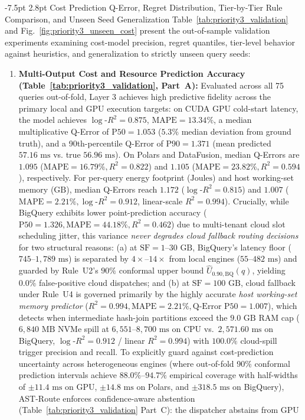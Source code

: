 \documentclass[10pt,a4paper]{article}
\makeatletter
\renewcommand\subsection{\@startsection{subsection}{2}{\z@}%
  {-7.5pt \@plus -2pt \@minus -1pt}%
  {2.8pt \@plus 1pt}%
  {\normalfont\normalsize\bfseries}}
\makeatother
\begin{document}
\subsection{Cost Prediction Q-Error, Regret Distribution, Tier-by-Tier Rule Comparison, and Unseen Seed Generalization}
Table~\ref{tab:priority3_validation} and Fig.~\ref{fig:priority3_unseen_cost} present the out-of-sample validation experiments examining cost-model precision, regret quantiles, tier-level behavior against heuristics, and generalization to strictly unseen query seeds:
\begin{enumerate}[leftmargin=1.5em,itemsep=0.8pt]
    \item \textbf{Multi-Output Cost and Resource Prediction Accuracy (Table~\ref{tab:priority3_validation}, Part~A):} Evaluated across all 75 queries out-of-fold, Layer 3 achieves high predictive fidelity across the primary local and GPU execution targets: on CUDA GPU cold-start latency, the model achieves $\log\text{-}R^2 = \mathbf{0.875}$, $\text{MAPE} = \mathbf{13.34\%}$, a median multiplicative Q-Error of $\text{P50} = \mathbf{1.053}$ ($5.3\%$ median deviation from ground truth), and a 90th-percentile Q-Error of $\text{P90} = \mathbf{1.371}$ (mean predicted $57.16\text{ ms}$ vs. true $56.96\text{ ms}$). On Polars and DataFusion, median Q-Errors are $\mathbf{1.095}$ ($\text{MAPE}=16.79\%, R^2=0.822$) and $\mathbf{1.105}$ ($\text{MAPE}=23.82\%, R^2=0.594$), respectively. For per-query energy footprint ($\text{Joules}$) and host working-set memory ($\text{GB}$), median Q-Errors reach $\mathbf{1.172}$ ($\log\text{-}R^2=0.815$) and $\mathbf{1.007}$ ($\text{MAPE}=2.21\%, \log\text{-}R^2=0.912$, linear-scale $R^2=0.994$). Crucially, while BigQuery exhibits lower point-prediction accuracy ($\text{P50}=1.326, \text{MAPE}=44.18\%, R^2=0.462$) due to multi-tenant cloud slot scheduling jitter, this variance \emph{never degrades cloud fallback routing decisions} for two structural reasons: (a) at $\text{SF}=1\text{--}30\text{ GB}$, BigQuery's latency floor ($745\text{--}1{,}789\text{ ms}$) is separated by $4\times\text{--}14\times$ from local engines ($55\text{--}482\text{ ms}$) and guarded by Rule~U2's $90\%$ conformal upper bound $\hat{U}_{0.90,\text{BQ}}(q)$, yielding $\mathbf{0.0\%}$ false-positive cloud dispatches; and (b) at $\text{SF}=100\text{ GB}$, cloud fallback under Rule~U4 is governed primarily by the highly accurate \emph{host working-set memory predictor} ($R^2 = \mathbf{0.994}, \text{MAPE} = \mathbf{2.21\%}, \text{Q-Error P50} = \mathbf{1.007}$), which detects when intermediate hash-join partitions exceed the $9.0\text{ GB}$ RAM cap ($6{,}840\text{ MB}$ NVMe spill at $6{,}551\text{--}8{,}700\text{ ms}$ on CPU vs.\ $2{,}571.60\text{ ms}$ on BigQuery, $\log\text{-}R^2=0.912$ / linear $R^2=0.994$) with $\mathbf{100.0\%}$ cloud-spill trigger precision and recall. To explicitly guard against cost-prediction uncertainty across heterogeneous engines (where out-of-fold 90\% conformal prediction intervals achieve $88.0\%\text{--}94.7\%$ empirical coverage with half-widths of $\pm 11.4\text{ ms}$ on GPU, $\pm 14.8\text{ ms}$ on Polars, and $\pm 318.5\text{ ms}$ on BigQuery), AST-Route enforces confidence-aware abstention (Table~\ref{tab:priority3_validation} Part~C): the dispatcher abstains from GPU 
\end{enumerate}
\end{document}
